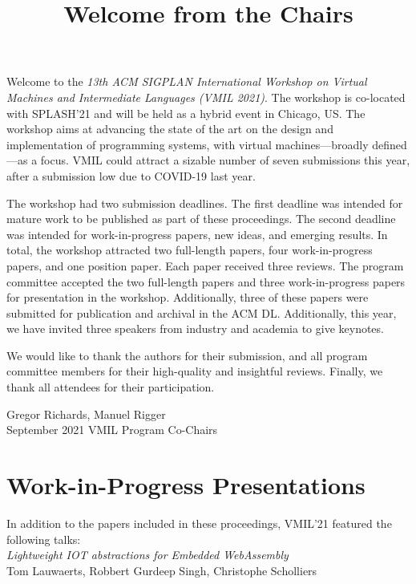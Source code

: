 \documentclass[12pt,letterpaper]{article}
\newcommand{\vmil}{VMIL'21\xspace}
\begin{document}
\title{\sffamily\bfseries Welcome from the Chairs}
\date{}

\maketitle
\thispagestyle{empty}
\pagestyle{empty}

Welcome to the \emph{13th ACM SIGPLAN International Workshop on Virtual Machines and Intermediate Languages (VMIL 2021)}. The workshop is co-located with SPLASH'21 and will be held as a hybrid event in Chicago, US.
The workshop aims at advancing the state of the art on the design and implementation of programming systems, with virtual machines---broadly defined---as a focus.
VMIL could attract a sizable number of seven submissions this year, after a submission low due to COVID-19 last year.

The workshop had two submission deadlines. The first deadline was intended for mature work to be published as part of these proceedings.
The second deadline was intended for work-in-progress papers, new ideas, and emerging results.
In total, the workshop attracted two full-length papers, four work-in-progress papers, and one position paper.
Each paper received three reviews.
The program committee accepted the two full-length papers and three work-in-progress papers for presentation in the workshop.
Additionally, three of these papers were submitted for publication and archival in the ACM DL.
Additionally, this year, we have invited three speakers from industry and academia to give keynotes.

We would like to thank the authors for their submission, and all program
committee members for their high-quality and insightful reviews. Finally, we thank
all attendees for their participation.

\bigskip
\noindent
       \hfill Gregor Richards, Manuel Rigger\\
September 2021 \hfill VMIL Program Co-Chairs


\clearpage{}

\section*{Work-in-Progress Presentations}

In addition to the papers included in these proceedings,
\vmil{} featured the following talks:
~\\

\noindent
\emph{Lightweight IOT abstractions for Embedded WebAssembly}\\
Tom Lauwaerts, Robbert Gurdeep Singh, Christophe Scholliers
~\\
\end{document}
